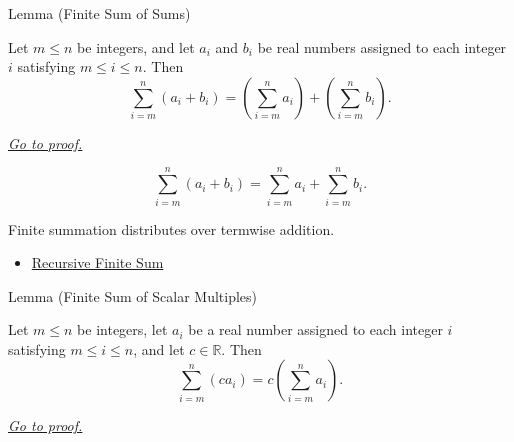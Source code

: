 \begin{lemmabox}{Lemma (Finite Sum of Sums)}
\begin{lemma}
\label{lem:finite-sum-of-sums}

Let \(m \le n\) be integers, and let \(a_i\) and \(b_i\) be real
numbers assigned to each integer \(i\) satisfying \(m \le i \le n\).
Then
\[
  \sum_{i=m}^{n} (a_i+b_i)
  =
  \left(\sum_{i=m}^{n} a_i\right)
  +
  \left(\sum_{i=m}^{n} b_i\right).
\]

\smallskip
\noindent
\hyperref[prf:finite-sum-of-sums]{\textit{Go to proof.}}
\end{lemma}
\end{lemmabox}

\begin{remark*}
\[
  \sum_{i=m}^{n}(a_i+b_i)
  =
  \sum_{i=m}^{n}a_i+\sum_{i=m}^{n}b_i.
\]
\end{remark*}

\begin{remark*}[Interpretation]
Finite summation distributes over termwise addition.
\end{remark*}

\begin{dependencies}
\begin{itemize}
  \item \hyperref[def:recursive-finite-sum]{Recursive Finite Sum}
\end{itemize}
\end{dependencies}

\begin{lemmabox}{Lemma (Finite Sum of Scalar Multiples)}
\begin{lemma}
\label{lem:finite-sum-scalar-multiple}

Let \(m \le n\) be integers, let \(a_i\) be a real number assigned to
each integer \(i\) satisfying \(m \le i \le n\), and let
\(c \in \mathbb{R}\). Then
\[
  \sum_{i=m}^{n} (c a_i)
  =
  c\left(\sum_{i=m}^{n} a_i\right).
\]

\smallskip
\noindent
\hyperref[prf:finite-sum-scalar-multiple]{\textit{Go to proof.}}
\end{lemma}
\end{lemmabox}

